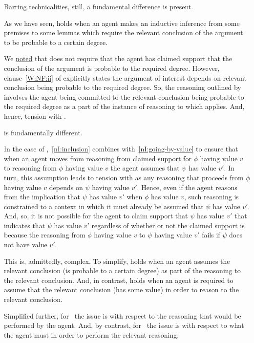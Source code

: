 \begin{note}
  Barring technicalities, still, a fundamental difference is present.

  As we have seen, \wnf{} holds when an agent makes an inductive inference from some premises to some lemmas which require the relevant conclusion of the argument to be probable to a certain degree.

  We \hyperref[wnf:expectation]{noted} that \wnf{} does not require that the agent has claimed support that the conclusion of the argument is probable to the required degree.
  However, clause~\ref{W:NF:ii} of \wnf{} explicitly states the argument of interest depends on relevant conclusion being probable to the required degree.
  So, the reasoning outlined by \wnf{} involves the agent being committed to the relevant conclusion being probable to the required degree as a part of the instance of reasoning to which \wnf{} applies.
  And, hence, tension with \eiS{}.

  \nI{} is fundamentally different.

  In the case of \nI{},~\ref{nI:inclusion} combines with~\ref{nI:going-by-value} to ensure that when an agent moves from reasoning from claimed support for \(\phi\) having value \(v\) to reasoning from \(\phi\) having value \(v\) the agent assumes that \(\psi\) has value \(v'\).
  In turn, this assumption leads to tension with \eiS{} as any reasoning that proceeds from \(\phi\) having value \(v\) depends on \(\psi\) having value \(v'\).
  Hence, even if the agent reasons from the implication that \(\psi\) has value \(v'\) when \(\phi\) has value \(v\), such reasoning is constrained to a context in which it must already be assumed that \(\psi\) has value \(v'\).
  And, so, it is not possible for the agent to claim support that \(\psi\) has value \(v'\) that indicates that \(\psi\) has value \(v'\) regardless of whether or not the claimed support is \mom{} because the reasoning from \(\phi\) having value \(v\) to \(\psi\) having value \(v'\) fails if \(\psi\) does not have value \(v'\).

  This is, admittedly, complex.
  To simplify, \wnf{} holds when an agent assumes the relevant conclusion (is probable to a certain degree) as part of the reasoning to the relevant conclusion.
  And, in contrast, \nI{} holds when an agent is required to assume that the relevant conclusion (has some value) in order to reason to the relevant conclusion.

  Simplified further, for~\wnf{} the issue is with respect to the reasoning that would be performed by the agent.
  And, by contrast, for~\nI{} the issue is with respect to what the agent must in order to perform the relevant reasoning.


\end{note}
